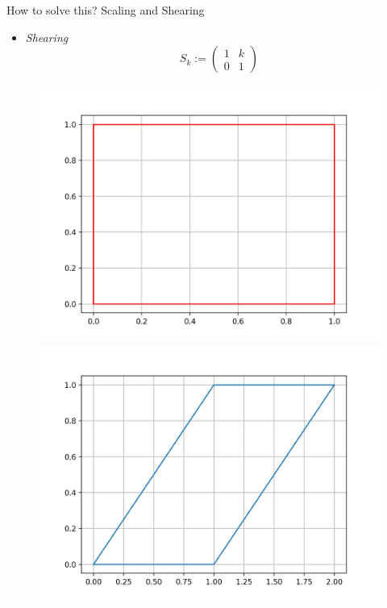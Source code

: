 \begin{frame}{How to solve this? Scaling and Shearing}
\pause

\begin{minipage}{0.25\textwidth}
\begin{itemize}
\item\textit{Shearing}
$$
S_k:=
\left(
\begin{matrix}
1 & k \\
0 & 1
\end{matrix}
\right)
$$
\end{itemize}
\end{minipage}  \hfill
\pause
\begin{minipage}{0.65\textwidth}
\begin{figure}[!tbp]
  \centering
  \begin{minipage}[b]{0.45\textwidth}
    \includegraphics[width=\textwidth]{./Images/square.png}
  \end{minipage}
	\pause
 \hfill 
  \begin{minipage}[b]{0.45\textwidth}
    \includegraphics[width=\textwidth]{./Images/square_sheared.png}
  \end{minipage}
\end{figure}
\end{minipage}

\end{frame}

